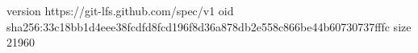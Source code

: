 version https://git-lfs.github.com/spec/v1
oid sha256:33c18bb1d4eee38fcdfd8fcd196f8d36a878db2e558c866be44b60730737fffc
size 21960
